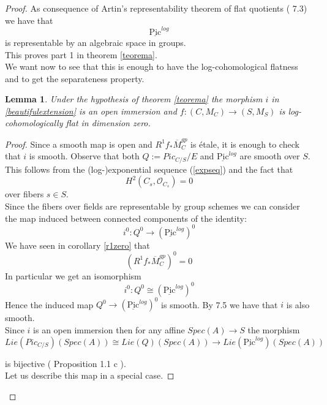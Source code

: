 \documentclass{amsart}
\newtheorem{lm}[thm]{Lemma}
\theoremstyle{definition}
\numberwithin{equation}{section}
\begin{document}
\begin{proof}
\noindent As consequence of Artin's representability theorem of flat quotients (\cite{aim} 7.3) we have that
$$
{\underline{\mbox{Pic}}^{log}}
$$
\noindent is representable by an algebraic space in groups.\\
This proves  part 1 in theorem \ref{teorema}.\\

\noindent We want now to see that this is enough to have the log-cohomological flatness and to get the separateness property.

\begin{lm}\label{iopen}
  Under the hypothesis of theorem \ref{teorema} the morphism $i$ in \ref{beautifulextension} is an open immersion and $f:(C,M_C){\rightarrow} (S,M_S)$ is log-cohomologically flat in dimension zero.
\end{lm}
\begin{proof}
    Since a smooth map is open and $R^1f_{*}\overline{M}_C^{gp}$ is \'etale, it is enough to check that $i$ is smooth. Observe that both $Q:=Pic_{C/S}/E$ and ${\underline{\mbox{Pic}}^{log}}$ are smooth over $S$.\\
This follows from the (log-)exponential sequence (\ref{expseq}) and the fact that 
$$H^2(C_s,{\mathcal{O}}_{C_s})=0$$
\noindent over fibers $s\in S$.\\
Since the fibers over fields are representable by group schemes we can consider the map induced between connected components of the identity:
$$
i^{0}:Q^0{\rightarrow} ({\underline{\mbox{Pic}}^{log}})^0
$$
\noindent We have seen in corollary \ref{r1zero} that
$$
(R^1f_{*}\overline{M}_{C}^{gp})^0=0
$$
In particular we get an isomorphism
$$
i^{0}:Q^0\cong ({\underline{\mbox{Pic}}^{log}})^0
$$
\noindent Hence the induced map $Q^0{\rightarrow} ({\underline{\mbox{Pic}}^{log}})^0$ is smooth.
By \cite{hol} 7.5 we have that $i$ is also smooth.\\

Since $i$ is an open immersion then for any affine $Spec(A){\rightarrow} S$ the morphism
$$
Lie(Pic_{C/S})(Spec(A))\cong Lie(Q)(Spec(A)){\rightarrow} Lie({\underline{\mbox{Pic}}^{log}})(Spec(A)) 
$$

\noindent is bijective (\cite{llr} Proposition 1.1 c ). \\
Let us describe this map in a special case.


\end{proof}
\end{proof}
\end{document}
